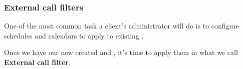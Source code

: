 \documentclass[letterpaper,10pt,spanish]{sphinxmanual}
\begin{document}
\subsubsection{External call filters}
\label{administration_portal/client/vpbx/routing_tools/external_call_filters:external-call-filters}\label{administration_portal/client/vpbx/routing_tools/external_call_filters:external-filters}\label{administration_portal/client/vpbx/routing_tools/external_call_filters::doc}\label{administration_portal/client/vpbx/routing_tools/external_call_filters:id1}
One of the most common task a client's administrator will do is to
configure schedules and calendars to apply to existing {\hyperref[administration_portal/brand/views/ddis:ddis]{}}.

Once we have our new created {\hyperref[administration_portal/client/vpbx/routing_tools/schedules:schedules]{}} and {\hyperref[administration_portal/client/vpbx/routing_tools/calendars:calendars]{}}, it's time to apply them
in what we call \textbf{External call filter}.
\end{document}
